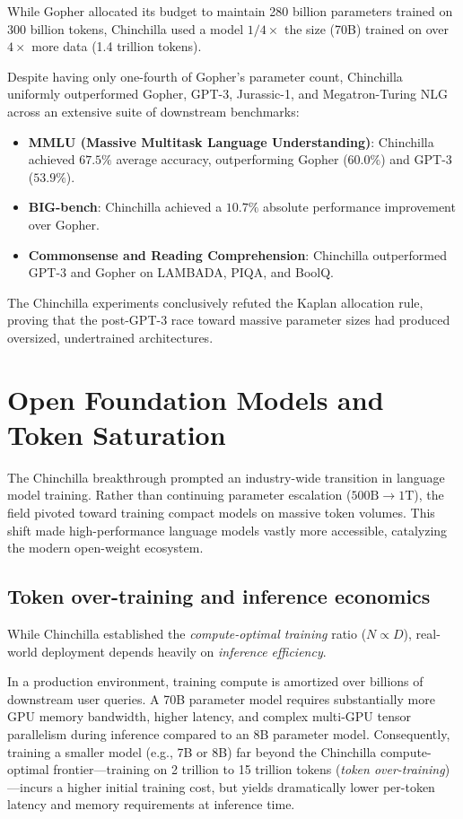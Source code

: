 \documentclass[../../main.tex]{subfiles}
\begin{document}
While Gopher allocated its budget to maintain 280 billion parameters trained on 300 billion tokens, Chinchilla used a model $1/4\times$ the size (70B) trained on over $4\times$ more data (1.4 trillion tokens).

Despite having only one-fourth of Gopher's parameter count, Chinchilla uniformly outperformed Gopher, GPT-3, Jurassic-1, and Megatron-Turing NLG across an extensive suite of downstream benchmarks:
\begin{itemize}
    \item \textbf{MMLU (Massive Multitask Language Understanding)}: Chinchilla achieved $67.5\%$ average accuracy, outperforming Gopher ($60.0\%$) and GPT-3 ($53.9\%$).
    \item \textbf{BIG-bench}: Chinchilla achieved a $10.7\%$ absolute performance improvement over Gopher.
    \item \textbf{Commonsense and Reading Comprehension}: Chinchilla outperformed GPT-3 and Gopher on LAMBADA, PIQA, and BoolQ.
\end{itemize}
The Chinchilla experiments conclusively refuted the Kaplan allocation rule, proving that the post-GPT-3 race toward massive parameter sizes had produced oversized, undertrained architectures.


\section{Open Foundation Models and Token Saturation}
\label{sec:open_models_paradigm}

The Chinchilla breakthrough prompted an industry-wide transition in language model training. Rather than continuing parameter escalation ($500\text{B} \to 1\text{T}$), the field pivoted toward training compact models on massive token volumes. This shift made high-performance language models vastly more accessible, catalyzing the modern open-weight ecosystem.


\subsection{Token over-training and inference economics}
\label{subsec:inference_economics}

While Chinchilla established the \emph{compute-optimal training} ratio ($N \propto D$), real-world deployment depends heavily on \emph{inference efficiency}.

In a production environment, training compute is amortized over billions of downstream user queries. A 70B parameter model requires substantially more GPU memory bandwidth, higher latency, and complex multi-GPU tensor parallelism during inference compared to an 8B parameter model. Consequently, training a smaller model (e.g., 7B or 8B) far beyond the Chinchilla compute-optimal frontier—training on 2 trillion to 15 trillion tokens (\emph{token over-training})—incurs a higher initial training cost, but yields dramatically lower per-token latency and memory requirements at inference time.
\end{document}
